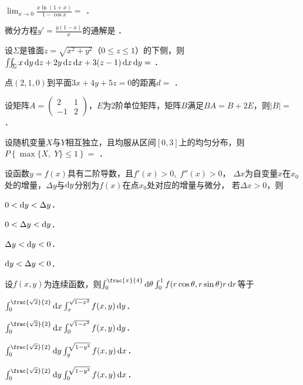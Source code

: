 \documentclass[plain,noanswer,medmath]{../../template/jnuexam}
\begin{document}




\begin{problem}
$\lim_{x \to 0} \frac{x\ln(1 + x)}{1 - \cos x} =$ \fillin{}．
\end{problem}


\begin{problem}
微分方程$y' = \frac{y(1 - x)}{x}$的通解是 \fillin{}．
\end{problem}


\begin{problem}
设$\Sigma$是锥面$z = \sqrt{x^2 + y^2}$（$0 \le z \le 1$）的下侧，则\goodbreak
$\iint_{\Sigma}x\mathop{}\!\mathrm{d} y\mathop{}\!\mathrm{d} z + 2y\mathop{}\!\mathrm{d} z\mathop{}\!\mathrm{d} x + 3(z - 1)\mathop{}\!\mathrm{d} x\mathop{}\!\mathrm{d} y =$ \fillin{}．
\end{problem}


\begin{problem}
点$(2,1,0)$到平面$3x + 4y + 5z = 0$的距离$d=$ \fillin{}．
\end{problem}


\begin{problem}
设矩阵$A = \begin{pmatrix}
   2 & 1 \\
  -1 & 2
\end{pmatrix}$，$E$为$2$阶单位矩阵，矩阵$B$满足$BA = B + 2E$，则$|B| =$ \fillin{}．
\end{problem}


\begin{problem}
设随机变量$X$与$Y$相互独立，且均服从区间$[0,3]$上的均匀分布，则\goodbreak
$P\left\{\max \{X,\;Y\} \le 1 \right\} =$ \fillin{}．
\end{problem}




\begin{problem}
设函数$y = f(x)$具有二阶导数，且$f'(x) > 0,\;f''(x) > 0$，
$\Delta x$为自变量$x$在$x_0$处的增量，$\Delta y$与$\mathop{}\!\mathrm{d} y$分别为$f(x)$在点$x_0$处对应的增量与微分，
若$\Delta x > 0$，则\pickout{}
\begin{abcd}
\item $0 < \mathop{}\!\mathrm{d} y < \Delta y$．
\item $0 < \Delta y < \mathop{}\!\mathrm{d} y$．
\item $\Delta y < \mathop{}\!\mathrm{d} y < 0$．
\item $\mathop{}\!\mathrm{d} y < \Delta y < 0$．
\end{abcd}
\end{problem}


\begin{problem}
设$f(x,y)$为连续函数，则$\int_0^{\frac{\pi}{4}}\d\theta\int_0^1 f(r\cos\theta,r\sin\theta)r\dr$等于\pickout{}
\begin{abcd}
\item $\int_0^{\frac{\sqrt{2}}{2}} \dx \int_x^{\sqrt{1 - x^2}} f(x,y)\dy$．
\item $\int_0^{\frac{\sqrt{2}}{2}} \dx \int_0^{\sqrt{1 - x^2}} f(x,y)\dy$．
\item $\int_0^{\frac{\sqrt{2}}{2}} \dy \int_y^{\sqrt{1 - y^2}} f(x,y)\dx$．
\item $\int_0^{\frac{\sqrt{2}}{2}} \dy \int_0^{\sqrt{1 - y^2}} f(x,y)\dx$．
\end{abcd}
\end{problem}
\end{document}

